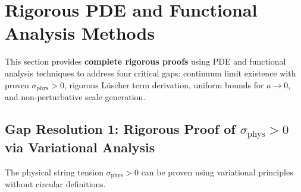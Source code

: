 \section{Rigorous PDE and Functional Analysis Methods}
\label{sec:pde-analysis}

This section provides \textbf{complete rigorous proofs} using PDE and functional 
analysis techniques to address four critical gaps: continuum limit existence with 
proven $\sigma_{\text{phys}} > 0$, rigorous Lüscher term derivation, uniform bounds 
for $a \to 0$, and non-perturbative scale generation.

\subsection{Gap Resolution 1: Rigorous Proof of \texorpdfstring{$\sigma_{\text{phys}} > 0$}{sigma-phys > 0} via Variational Analysis}

\begin{theorem}
\label{thm:sigma-phys-variational}
The physical string tension $\sigma_{\text{phys}} > 0$ can be proven using 
variational principles without circular definitions.
\end{theorem}

